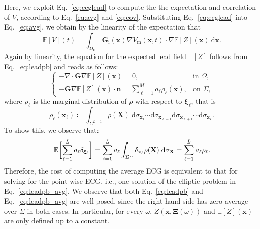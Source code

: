 \documentclass[runningheads]{llncs}
\newcommand{\bs}[1]{\boldsymbol{#1}}
\newcommand{\Vm}{V_\mathrm{m}}
\newcommand{\vX}{\mathbf{X}}
\newcommand{\vx}{\mathbf{x}}
\newcommand{\vn}{\mathbf{n}}
\newcommand{\tG}{\mathbf{G}}
\newcommand{\tGi}{\tG_\mathrm{i}}
\newcommand{\dd}{\mathrm{d}}
\newcommand{\EE}{\mathbb{E}}
\newcommand{\OmegaH}{\Omega_\mathrm{H}}
\begin{document}
Here, we exploit Eq.~\eqref{eq:ecglead} to compute the the expectation
and correlation of $V$, according to Eq.~\eqref{eq:avg} and \eqref{eq:cov}.
Substituting Eq.~\eqref{eq:ecglead} into Eq.~\eqref{eq:avg}, we obtain by
the linearity of the expectation that
\begin{equation}\label{eq:avg_lead}
\EE[V](t) = \int_{\OmegaH} \tGi(\vx)\nabla\Vm(\vx,t) \cdot\nabla \EE[Z](\vx) \:\dd{\vx}.
\end{equation}
Again by linearity, the equation for the expected lead field $\EE[Z]$ follows
from Eq.~\eqref{eq:leadpb} and reads as follows:
\begin{equation}\label{eq:leadpb_avg}
\begin{cases}
-\nabla\cdot\tG\nabla\EE[Z](\vx) = 0, & \text{in }\Omega, \\
-\tG\nabla \EE[Z](\vx)\cdot \vn = \sum_{\ell=1}^M a_\ell \rho_\ell(\vx),
& \text{on }\Sigma,
\end{cases}
\end{equation}
where $\rho_\ell$ is the marginal distribution of $\rho$ with respect to ${\bs\xi}_\ell$, that is
\begin{equation} \label{eq:margin1}
\rho_\ell(\vx_\ell) \coloneqq
\int_{\Sigma^{L-1}} \rho(\vX)\:\dd\sigma_{\vx_1}
\cdots \dd\sigma_{\vx_{\ell-1}}\dd\sigma_{\vx_{\ell+1}}\cdots \dd\sigma_{\vx_L}.
\end{equation}
To show this, we observe that:
\[
\EE\biggl[\sum_{\ell=1}^L a_\ell \delta_{{\bs\xi}_\ell}\biggr] =
\sum_{i=1}^L a_\ell \int_{\Sigma^L} \delta_{\vx_\ell} \rho(\vX)
\;\dd\sigma_{\vX} \\
= \sum_{\ell=1}^L a_\ell \rho_\ell.
\]
Therefore, the cost of computing the average ECG is equivalent to that for
solving for the point-wise ECG, i.e., one solution of the elliptic problem
in Eq.~\eqref{eq:leadpb_avg}.
We observe that both Eq.~\eqref{eq:leadpb} and Eq.~\eqref{eq:leadpb_avg}
are well-posed, since
the right hand side has zero average over $\Sigma$ in both cases.
In particular, for every $\omega$, $Z(\vx,{\bs\Xi}(\omega))$ 
and $\EE[Z](\vx)$ are only defined up to a constant.

\end{document}
